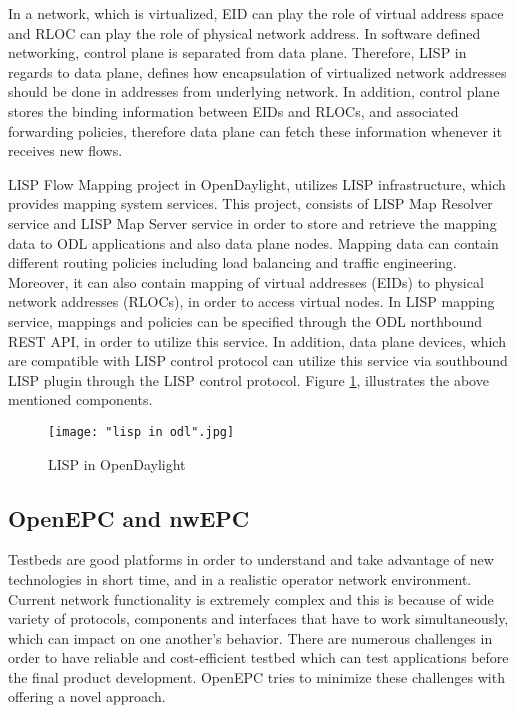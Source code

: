 \documentclass[english]{tktltiki2}
\theoremstyle{definition}
\theoremstyle{remark}
\begin{document}
In a network, which is virtualized, EID can play the role of virtual address space and RLOC can play the role of physical network address. In software defined networking, control plane is separated from data plane. Therefore, LISP in regards to data plane, defines how encapsulation of virtualized network addresses should be done in addresses from underlying network. In addition, control plane stores the binding information between EIDs and RLOCs, and associated forwarding policies, therefore data plane can fetch these information whenever it receives new flows. \cite{ODLLISP}  

LISP Flow Mapping project in OpenDaylight, utilizes LISP infrastructure, which provides mapping system services. This project, consists of LISP Map Resolver service and LISP Map Server service in order to store and retrieve the mapping data to ODL applications and  also data plane nodes. Mapping data can contain different routing policies including load balancing and traffic engineering. Moreover, it can also contain mapping of virtual addresses (EIDs) to physical network addresses (RLOCs), in order to access virtual nodes. In LISP mapping service, mappings and policies can be specified through the ODL northbound REST API, in order to utilize this service. In addition, data plane devices, which are compatible with LISP control protocol can utilize this service via southbound LISP plugin through the LISP control protocol. Figure \ref{fig:LispInODL}, illustrates the above mentioned components. 

\begin{figure}[h!t]
\centering
{}
\texttt{[image: "lisp in odl".jpg]}
\caption{LISP in OpenDaylight \cite{ODLLISP}}
\label{fig:LispInODL}
\end{figure}



\subsection{OpenEPC and nwEPC}

Testbeds are good platforms in order to understand and take advantage of new technologies in short time, and in a realistic operator network environment. Current network functionality is extremely complex and this is because of wide variety of protocols, components and interfaces that have to work simultaneously, which can impact on one another’s behavior. There are numerous challenges in order to have reliable and cost-efficient testbed which can test applications before the final product development. OpenEPC tries to minimize these challenges with offering a novel approach. \cite{OpenEPC}
\end{document}
